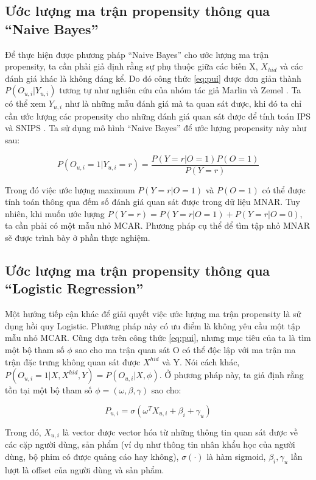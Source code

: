 \subsection{Ước lượng ma trận propensity thông qua ``Naive Bayes''}
\label{sec:3_estimate_NB}

Để thực hiện được phương pháp ``Naive Bayes'' cho ước lượng ma trận propensity, ta cần phải giả định rằng sự phụ thuộc giữa các biến X,   $X_{hid}$ và các đánh giá khác là không đáng kể. Do đó công thức \ref{eq:pui} được đơn giản thành $P(O_{u,i}|Y_{u,i})$ tương tự như nghiên cứu của nhóm tác giả Marlin và Zemel \cite{marlin2009}. Ta có thể xem $Y_{u,i}$ như là những mẫu đánh giá mà ta quan sát được, khi đó ta chỉ cần ước lượng các propensity cho những đánh giá quan sát được để tính toán IPS và SNIPS \cite{SNIPS}. Ta sử dụng mô hình ``Naive Bayes'' để ước lượng propensity này như sau:

\begin{equation}
\label{eq:pnb}
    P(O_{u,i} = 1| Y_{u,i} = r) = \frac{P(Y=r|O=1)P(O=1)}{P(Y=r)}
\end{equation}

Trong đó việc ước lượng maximum $P(Y=r|O=1)$ và $P(O=1)$ có thể được tính toán thông qua đếm số đánh giá  quan sát được trong dữ liệu MNAR. Tuy nhiên, khi muốn ước lượng $P(Y=r) = P(Y=r|O=1) + P(Y=r|O=0)$, ta cần phải có một mẫu nhỏ MCAR. Phương pháp cụ thể để tìm tập nhỏ MNAR sẽ được trình bày ở phần thực nghiệm.  

\subsection{Ước lượng ma trận propensity thông qua ``Logistic Regression''}
\label{sec:3_estimate_LR}
Một hướng tiếp cận khác để giải quyết việc  ước lượng ma trận propensity là sử dụng hồi quy Logistic. Phương pháp này có ưu điểm là không yêu cầu một tập mẫu nhỏ MCAR. Cũng dựa trên công thức \ref{eq:pui}, nhưng mục tiêu của ta là tìm một bộ tham số $\phi$ sao cho ma trận quan sát O có thể độc lập với ma trận ma
trận đặc trưng không quan sát được $X^{hid}$ và Y. Nói cách khác, $P(O_{u,i} = 1|X, X^{hid},Y) = P(O_{u,i}|X,\phi)$. Ở phương pháp này, ta giả định rằng tồn tại một bộ tham số $\phi=(\omega, \beta, \gamma)$ sao cho:

\begin{equation}
    \label{eq:plr}
    P_{u,i} = \sigma(\omega^TX_{u,i} + \beta_i + \gamma_u)
\end{equation}


Trong đó, $X_{u,i}$ là vector được vector hóa từ những thông tin quan sát được về các cặp người dùng, sản phẩm (ví dụ như thông tin nhân khẩu học của người dùng, bộ phim có được quảng cáo hay không), $\sigma(\cdot)$ là hàm sigmoid, $\beta_i, \gamma_u$ lần lượt là offset của người dùng và sản phẩm.


